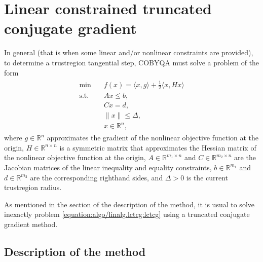 \documentclass[letterpaper,10pt,english]{sphinxmanual}
\newcommand{\norm}[2][]{#1\lVert#2#1\rVert}
\newcommand{\inner}[2][]{#1\langle#2#1\rangle}
\def\R{\ensuremath{\mathds{R}}}
\begin{document}
\section{Linear constrained truncated conjugate gradient}
\label{\detokenize{algo/linalg.lctcg:linear-constrained-truncated-conjugate-gradient}}\label{\detokenize{algo/linalg.lctcg:linalg-lctcg}}\label{\detokenize{algo/linalg.lctcg::doc}}
\sphinxAtStartPar
In general (that is when some linear and/or nonlinear constraints are
provided), to determine a trust\sphinxhyphen{}region tangential step, COBYQA must solve a
problem of the form
\begin{equation}\label{equation:algo/linalg.lctcg:lctcg}
\begin{split}\begin{array}{ll}
    \min        & \quad f(x) = \inner{x, g} + \frac{1}{2} \inner{x, H x}\\
    \text{s.t.} & \quad Ax \le b,\\
                & \quad Cx = d,\\
                & \quad \norm{x} \le \Delta,\\
                & \quad x \in \R^n,
\end{array}\end{split}
\end{equation}
\sphinxAtStartPar
where \(g \in \R^n\) approximates the gradient of the nonlinear objective
function at the origin, \(H \in \R^{n \times n}\) is a symmetric matrix
that approximates the Hessian matrix of the nonlinear objective function at the
origin, \(A \in \R^{m_1 \times n}\) and \(C \in \R^{m_2 \times n}\) are
the Jacobian matrices of the linear inequality and equality constraints,
\(b \in \R^{m_1}\) and \(d \in \R^{m_2}\) are the corresponding
right\sphinxhyphen{}hand sides, and \(\Delta > 0\) is the current trust\sphinxhyphen{}region radius.

\sphinxAtStartPar
As mentioned in the section {\hyperref[\detokenize{algo/linalg.bvtcg:tcg-base}]{}} of the description of the 
method, it is usual to solve inexactly problem \eqref{equation:algo/linalg.lctcg:lctcg} using a truncated
conjugate gradient method.


\subsection{Description of the method}
\label{\detokenize{algo/linalg.lctcg:description-of-the-method}}
\end{document}
